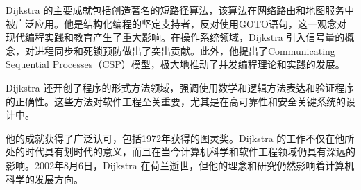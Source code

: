 \documentclass[a4paper,12pt]{article}
\begin{document}
Dijkstra 的主要成就包括创造著名的短路径算法，该算法在网络路由和地图服务中被广泛应用。他是结构化编程的坚定支持者，反对使用GOTO语句，这一观念对现代编程实践和教育产生了重大影响。在操作系统领域，Dijkstra 引入信号量的概念，对进程同步和死锁预防做出了突出贡献。此外，他提出了Communicating Sequential Processes（CSP）模型，极大地推动了并发编程理论和实践的发展。

Dijkstra 还开创了程序的形式方法领域，强调使用数学和逻辑方法表达和验证程序的正确性。这些方法对软件工程至关重要，尤其是在高可靠性和安全关键系统的设计中。

他的成就获得了广泛认可，包括1972年获得的图灵奖。Dijkstra 的工作不仅在他所处的时代具有划时代的意义，而且在当今计算机科学和软件工程领域仍具有深远的影响。2002年8月6日，Dijkstra 在荷兰逝世，但他的理念和研究仍然影响着计算机科学的发展方向。
\end{document}
